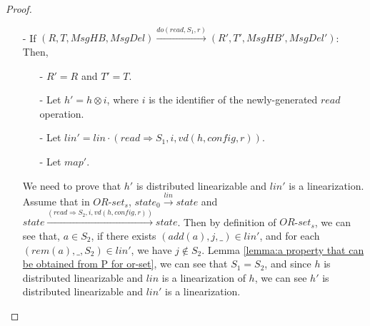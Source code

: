 {\begin {proof}
\begin{itemize}
\begin{itemize}
    \item[-] Let $\mathit{map}' = \mathit{map} \cup \{ (\mathit{mid},i) \}$.
    \end{itemize}

    It is easy to see that $h'$ is still distributed linearizable and $\mathit{lin}'$ is its linearization. We need to prove that $R'(r) = \mathit{apply}(\mathit{lin}',\mathit{vd}(h',\mathit{del}',r))$ and $C_4$ still holds for message $\mathit{mid}$.

    By Lemma \ref{lemma:a property that can be obtained from P for or-set}, it is not hard to see that $C_4$ still holds for message $\mathit{mid}$. From construction of $R'(r)$, Lemma \ref{lemma:a property that can be obtained from P for or-set} and $C_4$ holds for message $\mathit{mid}$, we can see that $R'(r) = \mathit{apply}(\mathit{lin}',\mathit{vd}(h',\mathit{del}',r))$.%


\item[-] If $(R,T,\mathit{MsgHB},\mathit{MsgDel}) {\xrightarrow{\mathit{do}(\mathit{read},S_1,r)}} (R',T',\mathit{MsgHB}',\mathit{MsgDel}')$: Then,

    \begin{itemize}
    \setlength{\itemsep}{0.5pt}
    \item[-] $R' = R$ and $T' = T$.

    \item[-] Let $h' = h \otimes i$, where $i$ is the identifier of the newly-generated $\mathit{read}$ operation.

    \item[-] Let $\mathit{lin}' = \mathit{lin} \cdot (\mathit{read} \Rightarrow S_1,i,\mathit{vd}(h,\mathit{config},r))$.

    \item[-] Let $\mathit{map}'$.
    \end{itemize}

    We need to prove that $h'$ is distributed linearizable and $\mathit{lin}'$ is a linearization. Assume that in $\mathit{OR}$-$\mathit{set}_s$, $\mathit{state}_0 {\xrightarrow{\mathit{lin}}} \mathit{state}$ and $\mathit{state} {\xrightarrow{ (\mathit{read} \Rightarrow S_2, i, \mathit{vd}(h,\mathit{config},r) ) }} \mathit{state}$. Then by definition of $\mathit{OR}$-$\mathit{set}_s$, we can see that, $a \in S_2$, if there exists $(\mathit{add}(a),j,\_) \in \mathit{lin}'$, and for each $(\mathit{rem}(a),\_,S_2) \in \mathit{lin}'$, we have $j \notin S_2$. Lemma \ref{lemma:a property that can be obtained from P for or-set}, we can see that $S_1 = S_2$, and since $h$ is distributed linearizable and $\mathit{lin}$ is a linearization of $h$, we can see $h'$ is distributed linearizable and $\mathit{lin}'$ is a linearization.


\end{itemize}
\end{proof}}
